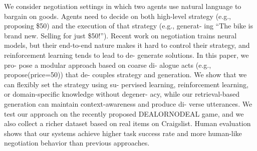 We consider negotiation settings in which two agents use natural language to bargain on goods. Agents need to decide on both high-level strategy (e.g., proposing \$50) and the execution of that strategy (e.g., generat- ing ``The bike is brand new. Selling for just \$50!''). Recent work on negotiation trains neural models, but their end-to-end nature makes it hard to control their strategy, and reinforcement learning tends to lead to de- generate solutions. In this paper, we pro- pose a modular approach based on coarse di- alogue acts (e.g., propose(price=50)) that de- couples strategy and generation. We show that we can flexibly set the strategy using su- pervised learning, reinforcement learning, or domain-specific knowledge without degener- acy, while our retrieval-based generation can maintain context-awareness and produce di- verse utterances. We test our approach on the recently proposed DEALORNODEAL game, and we also collect a richer dataset based on real items on Craigslist. Human evaluation shows that our systems achieve higher task success rate and more human-like negotiation behavior than previous approaches.
